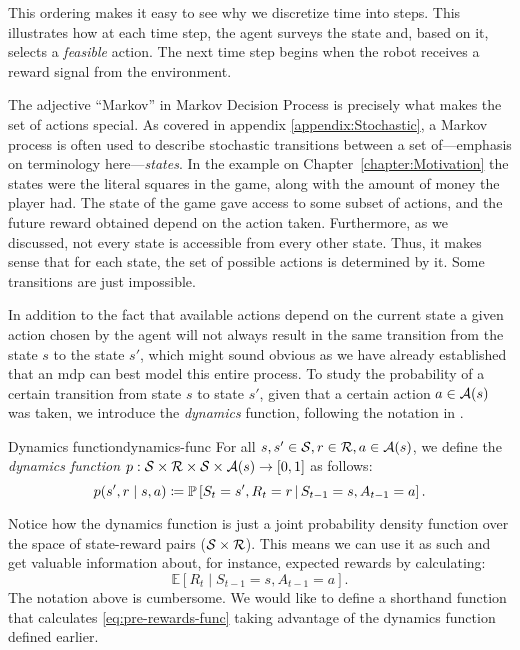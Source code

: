 This ordering makes it easy to see why we discretize time
into steps. This illustrates how at each time step, the agent surveys the state
and, based on it, selects a \textit{feasible} action. The next time step begins
when the robot receives a reward signal from the environment. 


The adjective ``Markov'' in Markov Decision Process is precisely what makes the
set of actions special. As covered in appendix \ref{appendix:Stochastic}, a Markov
process is often used to describe stochastic transitions between a set
of---emphasis on terminology here---\textit{states}. In the example on
Chapter~\ref{chapter:Motivation} the states were the literal squares in the
game, along with the amount of money the player had. The state of the game gave
access to some subset of actions, and the future reward obtained depend on the
action taken. Furthermore, as we discussed, not every state is accessible from
every other state.  Thus, it makes sense that for each state, the set of possible
actions is determined by it. Some transitions are just impossible.

In addition to the fact that available actions depend on the current state a
given action chosen by the agent will not always result in the same transition
from the state $s$ to the state $s'$, which might sound obvious as we have
already established that an \ac{mdp} can best model this entire process. To
study the probability of a certain transition from state $s$ to state $s'$,
given that a certain action $a \in \mathcal{A}(s)$ was taken, we introduce the
\textit{dynamics} function, following the notation in \cite{SuttonBarto}.

\begin{dfn}{Dynamics function}{dynamics-func}
	For all $s, s' \in \mathcal{S}, r \in \mathcal{R}, a \in 
	\mathcal{A}(s)$, we define the \emph{dynamics function} $p: 
	\mathcal{S} \times \mathcal{R} \times \mathcal{S} \times \mathcal{A}(s) 
	\to [0, 1]$ as follows:
	\[
		p(s', r \mid s, a) \coloneqq \mathbb{P}\left[S_t = s', R_t = r 
		\,\middle\vert\, S_{t-1} = s, A_{t-1} = a\right].
	\]
\end{dfn}

Notice how the dynamics function is just a joint probability density function
over the space of state-reward pairs ($\mathcal{S} \times \mathcal{R}$). This means we
can use it as such and get valuable information about, for instance, expected
rewards by calculating:
\begin{equation}
	\label{eq:pre-rewards-func}
	\mathbb{E} \left[ R_t \mid S_{t-1} = s, A_{t-1} = a \right].
\end{equation}
The notation above is cumbersome. We would like to define a shorthand function
that calculates \eqref{eq:pre-rewards-func} taking advantage of the dynamics
function defined earlier.

